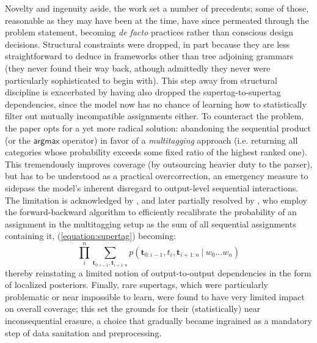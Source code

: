 Novelty and ingenuity aside, the work set a number of precedents; some of those, reasonable as they may have been at the time, have since permeated through the problem statement, becoming \textit{de facto} practices rather than conscious design decisions.
Structural constraints were dropped, in part because they are less straightforward to deduce in frameworks other than tree adjoining grammars (they never found their way back, athough admittedly they never were particularly sophisticated to begin with).
This step away from structural discipline is exacerbated by having also dropped the supertag-to-supertag dependencies, since the model now has no chance of learning how to statistically filter out mutually incompatible assignments either.
To counteract the problem, the paper opts for a yet more radical solution: abandoning the sequential product (or the $\mathsf{argmax}$ operator) in favor of a \textit{multitagging} approach (i.e. returning all categories whose probability exceeds some fixed ratio of the highest ranked one).
This tremendously improves coverage (by outsourcing heavier duty to the parser), but has to be understood as a practical overcorrection, an emergency measure to sidepass the model's inherent disregard to output-level sequential interactions.
The limitation is acknowledged by \citet{clark-curran-2004-importance}, and later partially resolved by \citet{curran2006multi}, who employ the forward-backward algorithm to efficiently recalibrate the probability of an assignment in the multitagging setup as the sum of all sequential assignments containing it, (\ref{equation:supertag}) becoming:
\begin{equation}
	\prod_i^n \sum_{\mathbf{t}_{0:i-1}, \mathbf{t}_{i+1:n}} p(\mathbf{t}_{0:i-1}, t_i, \mathbf{t}_{i+1:n} \ | \ w_0 \dots w_n)
\end{equation}
thereby reinstating a limited notion of output-to-output dependencies in the form of localized posteriors.
Finally, rare supertags, which were particularly problematic or near impossible to learn, were found to have very limited impact on overall coverage; this set the grounds for their (statistically) near inconsequential erasure, a choice that gradually became ingrained as a mandatory step of data sanitation and preprocessing.


